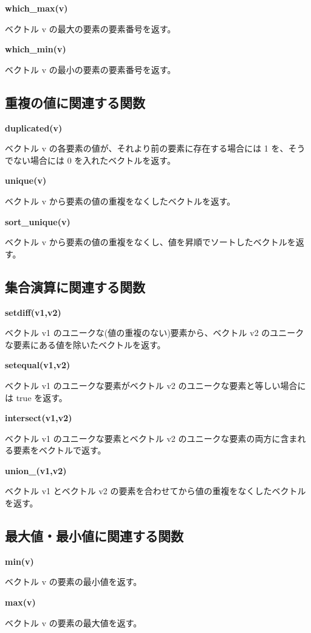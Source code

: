 \documentclass[]{book}
\begin{document}
\textbf{which\_max(v)}

ベクトル v の最大の要素の要素番号を返す。

\textbf{which\_min(v)}

ベクトル v の最小の要素の要素番号を返す。

\subsection{重複の値に関連する関数}

\textbf{duplicated(v)}

ベクトル v の各要素の値が、それより前の要素に存在する場合には 1 を、そうでない場合には 0 を入れたベクトルを返す。

\textbf{unique(v)}

ベクトル v から要素の値の重複をなくしたベクトルを返す。

\textbf{sort\_unique(v)}

ベクトル v から要素の値の重複をなくし、値を昇順でソートしたベクトルを返す。

\subsection{集合演算に関連する関数}

\textbf{setdiff(v1,v2)}

ベクトル v1 のユニークな(値の重複のない)要素から、ベクトル v2 のユニークな要素にある値を除いたベクトルを返す。

\textbf{setequal(v1,v2)}

ベクトル v1 のユニークな要素がベクトル v2 のユニークな要素と等しい場合には true を返す。

\textbf{intersect(v1,v2)}

ベクトル v1 のユニークな要素とベクトル v2 のユニークな要素の両方に含まれる要素をベクトルで返す。

\textbf{union\_(v1,v2)}

ベクトル v1 とベクトル v2 の要素を合わせてから値の重複をなくしたベクトルを返す。

\subsection{最大値・最小値に関連する関数}

\textbf{min(v)}

ベクトル v の要素の最小値を返す。

\textbf{max(v)}

ベクトル v の要素の最大値を返す。
\end{document}
